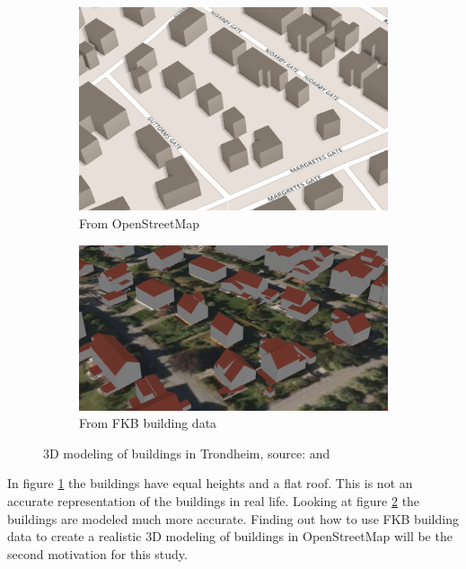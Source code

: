 \documentclass[12pt, a4paper]{report}   	%
\begin{document}
\begin{figure}[H]
\centering
\begin{subfigure}{.5\textwidth}
  \centering
  \includegraphics[width=.9\linewidth]{figures/FixedByMe/3DmodellTRD.png}
  \caption{From OpenStreetMap}
  \label{fig:3Dekstrd}
\end{subfigure}%
\begin{subfigure}{.5\textwidth}
  \centering
  \includegraphics[width=1\linewidth]{figures/FixedByMe/3DmodelTRD-FKB.png}
  \caption{From FKB building data}
  \label{fig:3DekstrdFKB}
\end{subfigure}
\caption{3D modeling of buildings in Trondheim, source: \cite{OSMbui2016} and \cite{NORKART2016}}
\label{fig:test}
\end{figure}

In figure \ref{fig:3Dekstrd} the buildings have equal heights and a flat roof. This is not an accurate representation of the buildings in real life. Looking at figure \ref{fig:3DekstrdFKB} the buildings are modeled much more accurate. Finding out how to use FKB building data to create a realistic 3D modeling of buildings in OpenStreetMap will be the second motivation for this study. 
\end{document}
